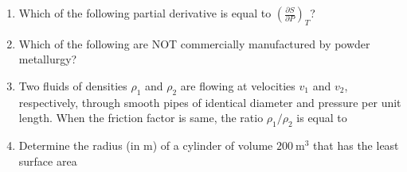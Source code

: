 \documentclass[journal,12pt,onecolumn]{IEEEtran}
\theoremstyle{remark}
\begin{document}
\begin{enumerate}
    \item Which of the following partial derivative is equal to $\left(\frac{\partial S}{\partial P}\right)_T$?
    \hfill{}
    \begin{enumerate}[label=(\Alph*)]
    \end{enumerate}

    \item Which of the following are NOT commercially manufactured by powder metallurgy?
    \hfill{}
    \begin{enumerate}[label=(\Alph*)]
    \end{enumerate}

    \item Two fluids of densities $\rho_1$ and $\rho_2$ are flowing at velocities $v_1$ and $v_2$, respectively, through smooth pipes of identical diameter and pressure per unit length. When the friction factor is same, the ratio $\rho_1/\rho_2$ is equal to
    \hfill{}
    \begin{enumerate}[label=(\Alph*)]
    \end{enumerate}
    

    

    \item Determine the radius (in m) of a cylinder of volume $200~\mathrm{m}^3$ that has the least surface area
    \hfill{}
    \begin{enumerate}[label=(\Alph*)]
    \end{enumerate}


\end{enumerate}
\end{document}
